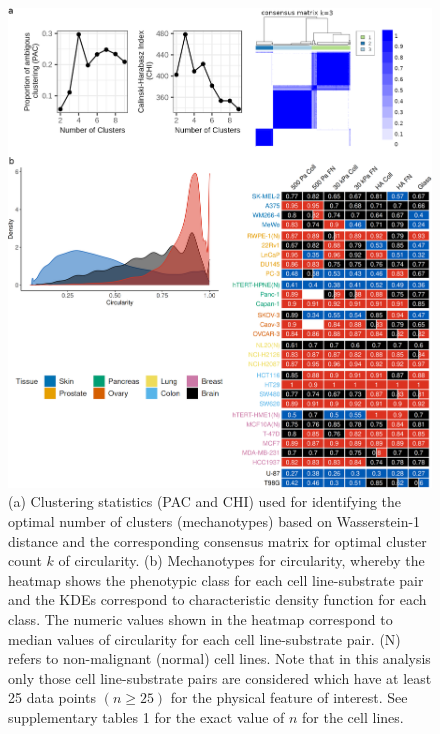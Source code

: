 \documentclass[11pt,letterpaper,english,oneside]{article} %
\begin{document}
\begin{figure}[H]
    \centering
    \includegraphics{../Figures/Supplementary_Figure13/supplementary_figure13.png}
    \caption{(a) Clustering statistics (PAC and CHI) used for identifying the optimal number of clusters (mechanotypes) based on Wasserstein-1 distance and the corresponding consensus matrix for optimal cluster count $k$
    of circularity. (b) Mechanotypes for circularity, whereby the heatmap shows the phenotypic class for each cell line-substrate pair and the KDEs correspond to characteristic density function for each class. 
    The numeric values shown in the heatmap correspond to median values of circularity for each cell line-substrate pair. (N) refers to non-malignant (normal) cell lines. 
    Note that in this analysis only those cell line-substrate pairs  are considered which have at least 25 data points $(n \geq 25)$ for the physical feature of interest.
    See supplementary tables 1 for the exact value of $n$ for the cell lines.}
    \label{fig:fig13}
\end{figure}
\end{document}

